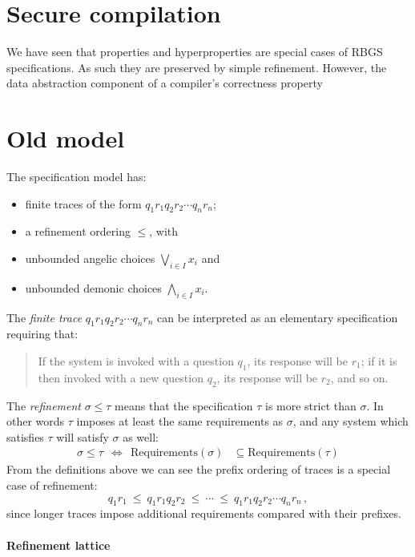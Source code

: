\documentclass[11pt]{article}
\begin{document}
\section{Secure compilation}

We have seen that properties and hyperproperties
are special cases of RBGS specifications.
As such they are preserved by simple refinement.
However,
the data abstraction component of a compiler's correctness property





\section*{Old model}

The specification model has:
\begin{itemize}
  \item finite traces of the form $q_1 r_1 q_2 r_2 \cdots q_n r_n$;
  \item a refinement ordering $\le$, with
  \item unbounded angelic choices $\bigvee_{i \in I} x_i$ and
  \item unbounded demonic choices $\bigwedge_{i \in I} x_i$.
\end{itemize}
The \emph{finite trace} $q_1 r_1 q_2 r_2 \cdots q_n r_n$
can be interpreted as an elementary specification requiring that:
\begin{quote}
  If the system is invoked with a question $q_1$,
  its response will be $r_1$;
  if it is then invoked with a new question $q_2$,
  its response will be $r_2$,
  and so on.
\end{quote}
The \emph{refinement} $\sigma \le \tau$
means that the specification $\tau$ is more strict than $\sigma$.
In other words $\tau$ imposes at least the same requirements as $\sigma$,
and any system which satisfies $\tau$ will satisfy $\sigma$ as well:
\begin{align*}
  \sigma \le \tau
  \:\:\Longleftrightarrow\:\:
  \mathrm{Requirements}(\sigma) &\subseteq
  \mathrm{Requirements}(\tau)
\end{align*}
From the definitions above we can see
the prefix ordering of traces is a special case of refinement:
\[
  q_1 r_1 \:\le\: q_1 r_1 q_2 r_2 \:\le\: \cdots \:\le\: q_1 r_1 q_2 r_2 \cdots q_n r_n
  \,,
\]
since longer traces impose additional requirements
compared with their prefixes.


\paragraph{Refinement lattice}
\end{document}
